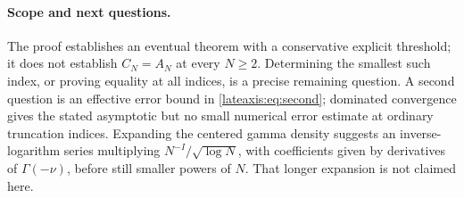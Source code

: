 \paragraph{Scope and next questions.}
The proof establishes an eventual theorem with a conservative explicit
threshold; it does not establish $C_N=A_N$ at every $N\ge2$.
Determining the smallest such index, or proving equality at all indices,
is a precise remaining question.  A second question is an effective
error bound in \eqref{lateaxis:eq:second}; dominated convergence gives
the stated asymptotic but no small numerical error estimate at ordinary
truncation indices.  Expanding the centered gamma density suggests an
inverse-logarithm series multiplying $N^{-I}/\sqrt{\log N}$, with
coefficients given by derivatives of $\Gamma(-\nu)$, before still
smaller powers of $N$.  That longer expansion is not claimed here.
